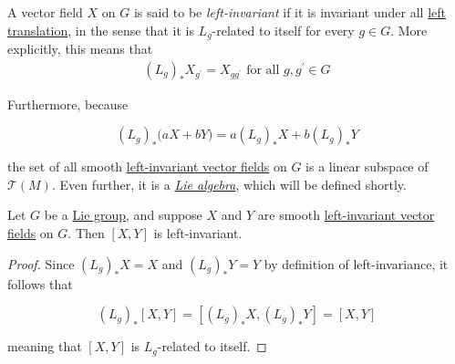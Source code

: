 \documentclass{article}
\newcounter{definition}[section]
\begin{document}
    \begin{definition}
      \label{def:left-invariant-vector-field}
      A vector field $X$ on $G$ is said to be \textit{left-invariant} if it is invariant under all \hyperref[alg-def:left-translation]{left translation}, in the sense that it is $L_g$-related to itself for every $g \in G$. More explicitly, this means that
      \begin{align*}
        (L_g)_* X_{g^\prime} = X_{g g^\prime} \text{ for all } g, g^\prime \in G
      \end{align*}
    \end{definition}

    Furthermore, because

      \begin{equation}
        (L_g)_* \big( a X + b Y \big) = a (L_g)_* X + b (L_g)_* Y
      \end{equation}

    the set of all smooth \hyperref[def:left-invariant-vector-field]{left-invariant vector fields} on $G$ is a linear subspace of $\mathcal{T}(M)$. Even further, it is a \textit{\hyperref[alg-def:lie-algebra]{Lie algebra}}, which will be defined shortly.  

    \begin{lemma}
      \label{thm:left-invariance-is-preserved-by-the-lie-bracket}
      Let $G$ be a \hyperref[def:lie-group]{Lie group}, and suppose $X$ and $Y$ are smooth \hyperref[def:left-invariant-vector-field]{left-invariant vector fields} on $G$. Then $[X, Y]$ is left-invariant. 
    \end{lemma}
    \begin{proof}
      Since $(L_g)_* X = X$ and $(L_g)_* Y = Y$ by definition of left-invariance, it follows that

        \begin{equation}
          (L_g)_* [X,Y] = [(L_g)_* X, (L_g)_* Y] = [X,Y]
        \end{equation}

      meaning that $[X, Y]$ is $L_g$-related to itself. 
    \end{proof}
\end{document}

